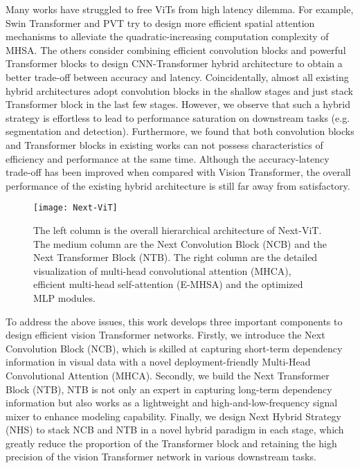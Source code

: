 \documentclass[10pt,twocolumn,letterpaper]{article}
\begin{document}
Many works have struggled to free ViTs from high latency dilemma. For example, Swin Transformer \cite{Swin} and PVT \cite{PVT_v1} try to design more efficient spatial attention mechanisms to alleviate the quadratic-increasing computation complexity of MHSA. The others \cite{CoAtNet, li2022efficientformer, MobileViT} consider combining efficient convolution blocks and powerful Transformer blocks to design CNN-Transformer hybrid architecture to obtain a better trade-off between accuracy and latency. Coincidentally, almost all existing hybrid architectures \cite{CoAtNet, li2022efficientformer, MobileViT} adopt convolution blocks in the shallow stages and just stack Transformer block in the last few stages. However, we observe that such a hybrid strategy is effortless to lead to performance saturation on downstream tasks (e.g. segmentation and detection). Furthermore, we found that both convolution blocks and Transformer blocks in existing works can not possess characteristics of efficiency and performance at the same time. Although the accuracy-latency trade-off has been improved when compared with Vision Transformer, the overall performance of the existing hybrid architecture is still far away from satisfactory.


\begin{figure*}[]
    \centering
    \texttt{[image: Next-ViT]}
    \caption{The left column is the overall hierarchical architecture of Next-ViT. 
    The medium column are the Next Convolution Block (NCB) and the Next Transformer Block (NTB). 
    The right column are the detailed visualization of multi-head convolutional attention (MHCA), efficient multi-head self-attention (E-MHSA) and the optimized MLP modules.}
    \label{fig:Next-ViT}
\end{figure*}

To address the above issues, this work develops three important components to design efficient vision Transformer networks. Firstly, we introduce the Next Convolution Block (NCB), which is skilled at capturing short-term dependency information in visual data with a novel deployment-friendly  Multi-Head Convolutional Attention (MHCA). Secondly, we build the Next Transformer Block (NTB), NTB is not only an expert in capturing long-term dependency information but also works as a lightweight and high-and-low-frequency signal mixer to enhance modeling capability. Finally, we design Next Hybrid Strategy (NHS) to stack NCB and NTB in a novel hybrid paradigm in each stage, which greatly reduce the proportion of the Transformer block and retaining the high precision of the vision Transformer network in various downstream tasks.
\end{document}
